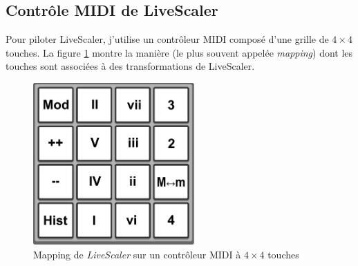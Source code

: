 \subsection{Contrôle MIDI de LiveScaler}
Pour piloter LiveScaler, j'utilise un contrôleur MIDI composé d'une grille de $4\times 4$ touches. La figure \ref{fig:mapping-ATOM} montre la manière (le plus souvent appelée \emph{mapping}) dont les touches sont associées à des transformations de LiveScaler. 

\begin{figure}[htbp]
  \centering
  \includegraphics[width=0.55\textwidth]{Figures/Pads-config.pdf}
  \caption{Mapping de \emph{LiveScaler} sur un contrôleur MIDI à $4\times 4$ touches\label{fig:mapping-ATOM}}
\end{figure}

